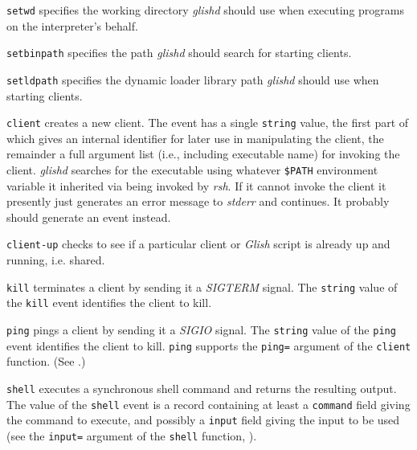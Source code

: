 \begin{sloppy}
\begin{list}{}{}
\item[{\tt setwd}] specifies
the working directory {\em glishd} should use when executing programs
on the interpreter's behalf.

\item[{\tt setbinpath}] specifies
the path {\em glishd} should search for starting clients.

\item[{\tt setldpath}] specifies
the dynamic loader library path {\em glishd} should use when starting clients.

\item[{\tt client}] creates
a new client.  The event has a single
{\tt string} value, the first part of which gives an internal
identifier for later use in manipulating the client, the remainder a
full argument list (i.e., including executable name) for invoking the
client.  {\em glishd} searches for the executable using whatever
{\tt \$PATH} environment variable it inherited via being invoked
by {\em rsh\/}.  If it cannot invoke the client it presently just
generates an error message to {\em stderr} and continues.  It probably
should generate an event instead.

\item[{\tt client-up}] checks to see 
if a particular client or {\em Glish} script is already up and running, i.e.
shared.

\item[{\tt kill}] terminates
a client by sending it a {\em SIGTERM}
signal.  The {\tt string} value of the {\tt kill} event identifies
the client to kill.

\item[{\tt ping}] pings
a client by sending it a {\em SIGIO}
signal.  The {\tt string} value of the {\tt ping} event identifies
the client to kill.  {\tt ping} supports the {\tt ping=} argument
of the {\tt client} function.  (See .)

\item[{\tt shell}] executes
a synchronous shell command and returns
the resulting output.  The value of the {\tt shell} event is a 
record containing at least a {\tt command} field giving the command
to execute, and possibly a {\tt input} field giving the input to
be used (see the {\tt input=} argument of the {\tt shell} function,
).


\end{list}
\end{sloppy}
